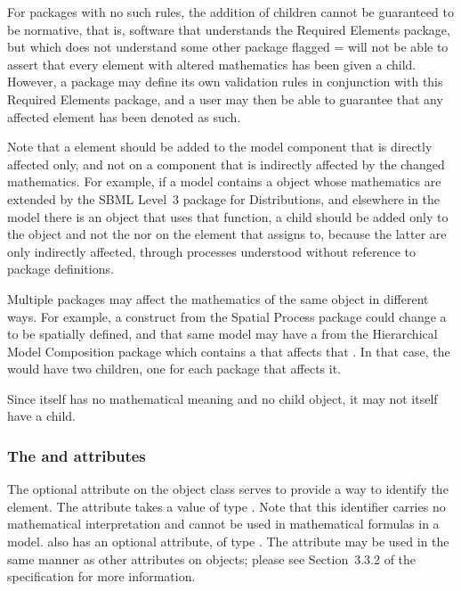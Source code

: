 For packages with no such rules, the addition of \MathChanged children cannot be guaranteed to be normative, that is, software that understands the Required Elements package, but which does not understand some other package flagged = will not be able to assert that every element with altered mathematics has been given a \MathChanged child.  However, a package may define its own validation rules in conjunction with this Required Elements package, and a user may then be able to guarantee that any affected element has been denoted as such.

Note that a \MathChanged element should be added to the model component that is directly affected only, and not on a component that is indirectly affected by the changed mathematics.  For example, if a model contains a \FunctionDefinition object whose mathematics are extended by the SBML Level~3 package for Distributions, and elsewhere in the model there is an \InitialAssignment object that uses that function, a \MathChanged child should be added only to the \FunctionDefinition object and not the \InitialAssignment nor on the element that assigns to, because the latter are only indirectly affected, through processes understood without reference to package definitions.

Multiple packages may affect the mathematics of the same object in different ways.  For example, a construct from the Spatial Process package could change a \Species to be spatially defined, and that same model may have a \Submodel from the Hierarchical Model Composition package which contains a \Reaction that affects that \Species.  In that case, the \Species would have two \MathChanged children, one for each package that affects it.

Since \MathChanged itself has no mathematical meaning and no child \Math object, it may not itself have a \MathChanged child.

\subsubsection{The \fixttspace{} and \fixttspace{} attributes}
\label{idname-attributes}

The optional  attribute on the \MathChanged object class serves to provide a way to identify the element.  The attribute takes a value of type .  Note that this identifier carries no mathematical interpretation and cannot be used in mathematical formulas in a model.  \MathChanged also has an optional  attribute, of type .  The  attribute may be used in the same manner as other  attributes on \sbmlthreecore objects; please see Section~3.3.2 of the \sbmlthreecore specification for more information.


